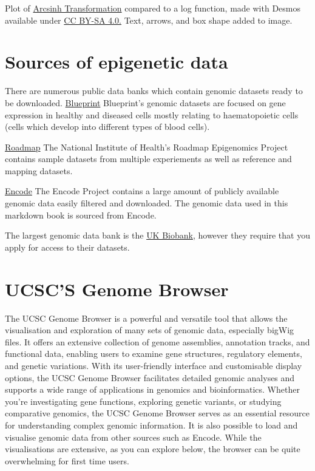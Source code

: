 \documentclass[
]{book}
\begin{document}
Plot of \href{https://miro.medium.com/v2/resize:fit:1100/format:webp/1*glJtHk1HRZpYHsk79QxgwQ.png}{Arcsinh Transformation} compared to a log function, made with Desmos available under \href{https://miro.medium.com/v2/resize:fit:1100/format:webp/1*glJtHk1HRZpYHsk79QxgwQ.png}{CC BY-SA 4.0.} Text, arrows, and box shape added to image.

\section{Sources of epigenetic data}\label{sources-of-epigenetic-data}

There are numerous public data banks which contain genomic datasets ready to be downloaded.
\href{https://projects.ensembl.org/blueprint/}{Blueprint}
Blueprint's genomic datasets are focused on gene expression in healthy and diseased cells mostly relating to haematopoietic cells (cells which develop into different types of blood cells).

\href{https://www.ncbi.nlm.nih.gov/geo/roadmap/epigenomics/}{Roadmap}
The National Institute of Health's Roadmap Epigenomics Project contains sample datasets from multiple experiements as well as reference and mapping datasets.

\href{https://www.encodeproject.org/}{Encode}
The Encode Project contains a large amount of publicly available genomic data easily filtered and downloaded. The genomic data used in this markdown book is sourced from Encode.

The largest genomic data bank is the \href{https://www.ukbiobank.ac.uk/}{UK Biobank}, however they require that you apply for access to their datasets.

\section{UCSC'S Genome Browser}\label{ucscs-genome-browser}

The UCSC Genome Browser is a powerful and versatile tool that allows the visualisation and exploration of many sets of genomic data, especially bigWig files. It offers an extensive collection of genome assemblies, annotation tracks, and functional data, enabling users to examine gene structures, regulatory elements, and genetic variations. With its user-friendly interface and customisable display options, the UCSC Genome Browser facilitates detailed genomic analyses and supports a wide range of applications in genomics and bioinformatics. Whether you're investigating gene functions, exploring genetic variants, or studying comparative genomics, the UCSC Genome Browser serves as an essential resource for understanding complex genomic information. It is also possible to load and visualise genomic data from other sources such as Encode. While the visualisations are extensive, as you can explore below, the browser can be quite overwhelming for first time users.
\end{document}

